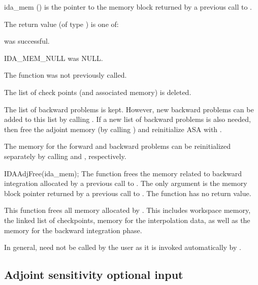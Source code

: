 {
  \begin{args}
  \item[ida\_mem] ()
    is the pointer to the {\idas} memory block returned by a previous call to
    .
  \end{args}
}
{
   The return value  (of type ) is one of:
   \begin{args}
   \item[\Id{IDA\_SUCCESS}] 
      was successful.
   \item[IDA\_MEM\_NULL] 
      was NULL.
   \item[\Id{IDA\_NO\_ADJ}]
     The function  was not previously called.
   \end{args}
}
{
  The list of check points (and associated memory) is deleted.

  The list of backward problems is kept. However, new backward problems can 
  be added to this list by calling . If a new list of backward
  problems is also needed, then free the adjoint memory (by calling
  ) and reinitialize ASA with .

  The {\idas} memory for the forward and backward problems can be reinitialized
  separately by calling  and , respectively.
}



{
  IDAAdjFree(ida\_mem);
}
{
  The function  frees the memory related to backward integration
  allocated by a previous call to .
}
{
  The only argument is the {\idas} memory block pointer returned by a previous call 
  to .
}
{
  The function  has no return value.
}
{
  This function frees all memory allocated by . This
  includes workspace memory, the linked list of checkpoints, memory
  for the interpolation data, as well as the {\idas} memory for the
  backward integration phase.

  In general,  need not be called by the user as it is
  invoked automatically by .
}


\subsection{Adjoint sensitivity optional input}

